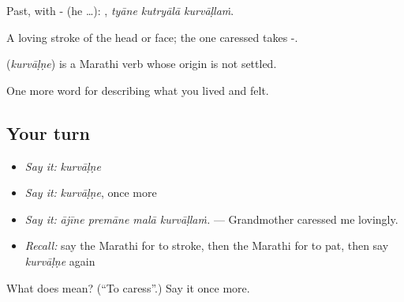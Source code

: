 Past, with - (he …):   , \emph{tyāne kutryālā kurvāḷlaṁ}.

A loving stroke of the head or face; the one caressed takes -.

\begin{cousinweb}
\textbf{} (\emph{kurvāḷṇe}) is a Marathi verb whose origin is not settled.
\end{cousinweb}

\begin{grammarlens}[title={What you've built}]
One more word for describing what you lived and felt.
\end{grammarlens}

\subsection*{Your turn}
\begin{itemize}
\raggedright
  \item \emph{Say it:} \emph{kurvāḷṇe}
  \item \emph{Say it:} \emph{kurvāḷṇe}, once more
  \item \emph{Say it:} \emph{ājīne premāne malā kurvāḷlaṁ.} — Grandmother caressed me lovingly.
  \item \emph{Recall:} say the Marathi for to stroke, then the Marathi for to pat, then say \emph{kurvāḷṇe} again
\end{itemize}

\begin{tcolorbox}[breakable,colback=teal!4,colframe=teal!35!black,title={Before you move on}]
What does  mean? (\textquotedblleft{}To caress\textquotedblright{}.) Say it once more.
\end{tcolorbox}

